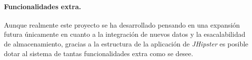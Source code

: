 \paragraph*{Funcionalidades extra.} Aunque realmente este proyecto se ha desarrollado pensando en una expansión futura únicamente en cuanto a la integración de nuevos datos y la esacalabilidad de almacenamiento, gracias a la estructura de la aplicación de \textit{JHipster} es posible dotar al sistema de tantas funcionalidades extra como se desee. 







